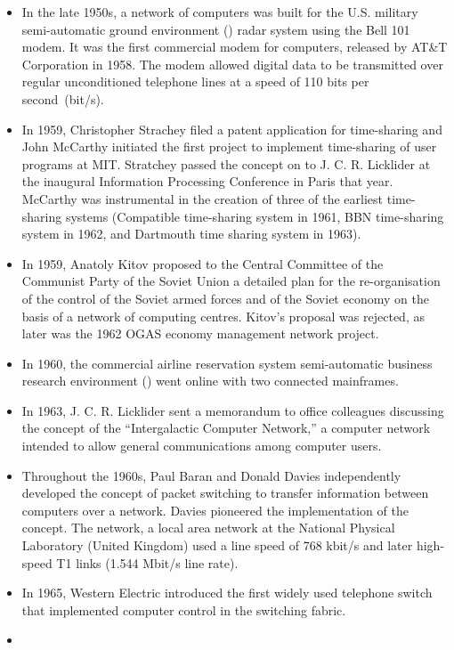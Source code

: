 \begin{itemize}
\item
   In the late 1950s, a network of computers was built for the U.S. military semi-automatic ground environment () radar system using the Bell 101 modem.
   It was the first commercial modem for computers, released by AT\&T Corporation in 1958.
   The modem allowed digital data to be transmitted over regular unconditioned telephone lines at a speed of 110 bits per second~(bit/s).
\item
   In 1959, Christopher Strachey filed a patent application for time-sharing and John McCarthy initiated the first project to implement time-sharing of user programs at MIT.
   Stratchey passed the concept on to J. C. R. Licklider at the inaugural  Information Processing Conference in Paris that year.
   McCarthy was instrumental in the creation of three of the earliest time-sharing systems (Compatible time-sharing system in 1961, BBN time-sharing system in 1962, and Dartmouth time sharing system in 1963).
\item
   In 1959, Anatoly Kitov proposed to the Central Committee of the Communist Party of the Soviet Union a detailed plan for the re-organisation of the control of the Soviet armed forces and of the Soviet economy on the basis of a network of computing centres.
   Kitov's proposal was rejected, as later was the 1962 OGAS economy management network project.
\item
   In 1960, the commercial airline reservation system semi-automatic business research environment () went online with two connected mainframes.
\item
   In 1963, J. C. R. Licklider sent a memorandum to office colleagues discussing the concept of the ``Intergalactic Computer Network,'' a computer network intended to allow general communications among computer users.
\item
   Throughout the 1960s, Paul Baran and Donald Davies independently developed the concept of packet switching to transfer information between computers over a network.
   Davies pioneered the implementation of the concept.
   The  network, a local area network at the National Physical Laboratory (United Kingdom) used a line speed of 768 kbit/s and later high-speed T1 links (1.544 Mbit/s line rate).
\item
   In 1965, Western Electric introduced the first widely used telephone switch that implemented computer control in the switching fabric.
\item

\end{itemize}
